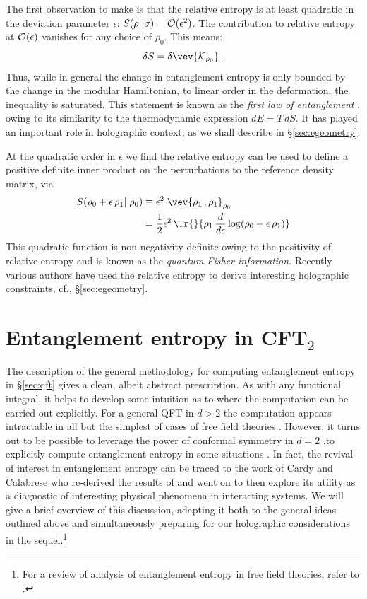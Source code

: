 \documentclass[12pt,openany]{book}
\begin{document}
The first observation to make is that the relative entropy is at least quadratic in the deviation parameter $\epsilon$: $S(\rho||\sigma) = {\cal O}(\epsilon^2)$. The contribution to relative entropy at ${\cal O}(\epsilon)$  vanishes for any choice of $\rho_0$. This means:
%
\begin{equation}
\delta S = \delta \vev{{\cal K}_{\rho_0}}\,.
\label{eq:e1stlaw}
\end{equation}
%
Thus, while in general the change in entanglement entropy is only bounded by the change in the modular Hamiltonian, to linear order in the deformation, the inequality is saturated.  This statement is known as the \emph{first law of entanglement} \cite{Blanco:2013joa}, owing to its similarity to the thermodynamic expression $dE = T\, dS$. It has played an important role in holographic context, as we shall describe in \S\ref{sec:egeometry}.

At the quadratic order in $\epsilon$ we find the relative entropy can be used to define a positive definite inner product on the perturbations to the reference density matrix, via
%
\begin{align}
S(\rho_0 + \epsilon \, \rho_1||\rho_0 )
&\equiv \epsilon^2\; \vev{\rho_1\,, \rho_1}_{\rho_0}
\nonumber \\
&= \frac{1}{2}\epsilon^2 \,  \Tr{}{\rho_1 \,\frac{d}{d\epsilon} \log(\rho_0+\epsilon\, \rho_1)}
\label{eq:qfisher}
\end{align}
%
This quadratic function is non-negativity definite owing to the positivity of relative entropy and is known as the \emph{quantum Fisher information}. Recently various authors have used the relative entropy to derive interesting holographic constraints, cf., \S\ref{sec:egeometry}.


\chapter{Entanglement entropy in CFT$_2$}
\label{sec:eecft2}

The description of the general methodology for computing entanglement entropy in \S\ref{sec:qft} gives a clean, albeit abstract prescription. As with any functional integral, it helps to develop some intuition as to where the computation can be carried out explicitly. For a general QFT in $d >2$ the computation appears intractable in all but the simplest of cases of free field theories \cite{Srednicki:1993im}. However, it turns out to be possible to leverage the power of conformal symmetry in $d=2$ ,to explicitly compute entanglement entropy in some situations \cite{Calabrese:2009qy}. In fact, the revival of interest in entanglement entropy can be traced to the work of Cardy and Calabrese \cite{Calabrese:2004eu} who re-derived the results of \cite{Holzhey:1994we} and went on to then explore its utility as a diagnostic of interesting physical phenomena in interacting systems. We will give a brief overview of this discussion, adapting it both to the general ideas outlined above and simultaneously preparing  for our holographic considerations in the sequel.\footnote{ For a review of analysis of entanglement entropy in free field theories, refer to \cite{Casini:2009sr}.}
\end{document}
